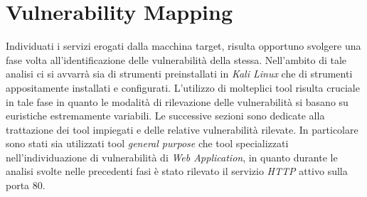 \section{Vulnerability Mapping}
Individuati i servizi erogati dalla macchina target, risulta opportuno svolgere una fase volta all'identificazione delle vulnerabilità della stessa. Nell'ambito di tale analisi ci si avvarrà sia di strumenti preinstallati in \emph{Kali Linux} che di strumenti appositamente installati e configurati. L'utilizzo di molteplici tool risulta cruciale in tale fase in quanto le modalità di rilevazione delle vulnerabilità si basano su euristiche estremamente variabili. Le successive sezioni sono dedicate alla trattazione dei tool impiegati e delle relative vulnerabilità rilevate. In particolare sono stati sia utilizzati tool \emph{general purpose} che tool specializzati nell'individuazione di vulnerabilità di \emph{Web Application}, in quanto durante le analisi svolte nelle precedenti fasi è stato rilevato il servizio \emph{HTTP} attivo sulla porta 80. 
